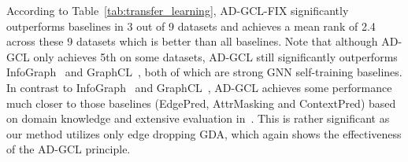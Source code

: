 According to Table~\ref{tab:transfer_learning}, AD-GCL-FIX significantly outperforms baselines in 3 out of 9 datasets and achieves a mean rank of 2.4 across these 9 datasets which is better than all baselines. Note that although AD-GCL only achieves 5th on some datasets, AD-GCL still significantly outperforms InfoGraph~\cite{sun2019infograph} and GraphCL~\cite{you2020graph}, both of which are strong GNN self-training baselines. In contrast to InfoGraph~\cite{sun2019infograph} and GraphCL~\cite{you2020graph}, AD-GCL achieves some performance much closer to those baselines (EdgePred, AttrMasking and ContextPred) based on domain knowledge and extensive evaluation in~\cite{hu2019strategies}. This is rather significant as our method utilizes only edge dropping GDA, which again shows the effectiveness of the AD-GCL principle.

\vspace{-2mm}
